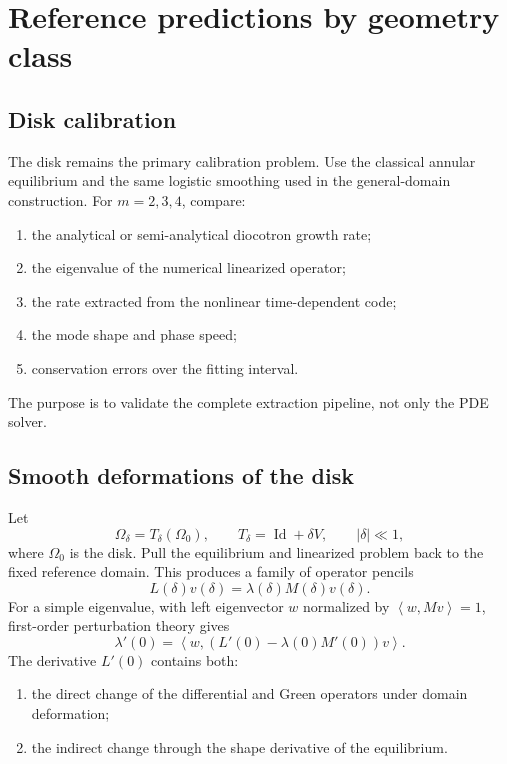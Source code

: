 \documentclass[11pt,a4paper]{article}
\newcommand{\Om}{\Omega}
\newcommand{\abs}[1]{\left|#1\right|}
\newcommand{\ip}[2]{\left\langle #1,#2\right\rangle}
\begin{document}
\section{Reference predictions by geometry class}

\subsection{Disk calibration}

The disk remains the primary calibration problem. Use the classical annular equilibrium and the same logistic smoothing used in the general-domain construction. For $m=2,3,4$, compare:
\begin{enumerate}
  \item the analytical or semi-analytical diocotron growth rate;
  \item the eigenvalue of the numerical linearized operator;
  \item the rate extracted from the nonlinear time-dependent code;
  \item the mode shape and phase speed;
  \item conservation errors over the fitting interval.
\end{enumerate}
The purpose is to validate the complete extraction pipeline, not only the PDE solver.

\subsection{Smooth deformations of the disk}

Let
\begin{equation}
  \Om_\delta=T_\delta(\Om_0),
  \qquad
  T_\delta=\operatorname{Id}+\delta V,
  \qquad
  \abs{\delta}\ll1,
  \label{eq:shape-family}
\end{equation}
where $\Om_0$ is the disk. Pull the equilibrium and linearized problem back to the fixed reference domain. This produces a family of operator pencils
\begin{equation}
  L(\delta)v(\delta)
  =\lambda(\delta)M(\delta)v(\delta).
  \label{eq:operator-pencil-shape}
\end{equation}
For a simple eigenvalue, with left eigenvector $w$ normalized by $\ip{w}{Mv}=1$, first-order perturbation theory gives
\begin{equation}
  \lambda'(0)
  =\ip{w}{\left(L'(0)-\lambda(0)M'(0)\right)v}.
  \label{eq:eigenvalue-shape-derivative}
\end{equation}
The derivative $L'(0)$ contains both:
\begin{enumerate}[label=(\roman*)]
  \item the direct change of the differential and Green operators under domain deformation;
  \item the indirect change through the shape derivative of the equilibrium.
\end{enumerate}
\end{document}
